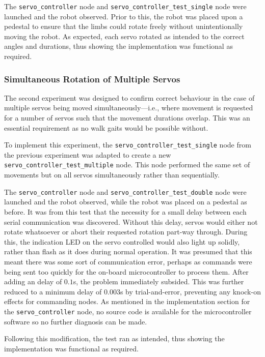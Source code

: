 The \texttt{servo\_controller} node and \texttt{servo\_controller\_test\_single} node were launched and the robot observed. Prior to this, the robot was placed upon a pedestal to ensure that the limbs could rotate freely without unintentionally moving the robot. As expected, each servo rotated as intended to the correct angles and durations, thus showing the implementation was functional as required.

\subsubsection{Simultaneous Rotation of Multiple Servos}

The second experiment was designed to confirm correct behaviour in the case of multiple servos being moved simultaneously---i.e., where movement is requested for a number of servos such that the movement durations overlap. This was an essential requirement as no walk gaits would be possible without.

To implement this experiment, the \texttt{servo\_controller\_test\_single} node from the previous experiment was adapted to create a new \texttt{servo\_controller\_test\_multiple} node. This node performed the same set of movements but on all servos simultaneously rather than sequentially.

The \texttt{servo\_controller} node and \texttt{servo\_controller\_test\_double} node were launched and the robot observed, while the robot was placed on a pedestal as before. It was from this test that the necessity for a small delay between each serial communication was discovered. Without this delay, servos would either not rotate whatsoever or abort their requested rotation part-way through. During this, the indication LED on the servo controlled would also light up solidly, rather than flash as it does during normal operation. It was presumed that this meant there was some sort of communication error, perhaps as commands were being sent too quickly for the on-board microcontroller to process them. After adding an delay of $0.1$s, the problem immediately subsided. This was further reduced to a minimum delay of $0.003$s by trial-and-error, preventing any knock-on effects for commanding nodes. As mentioned in the implementation section for the \texttt{servo\_controller} node, no source code is available for the microcontroller software so no further diagnosis can be made. 

Following this modification, the test ran as intended, thus showing the implementation was functional as required.

